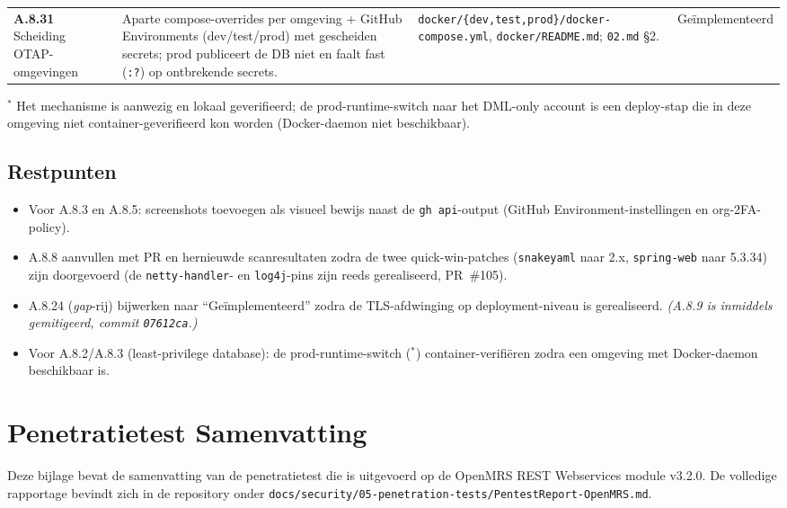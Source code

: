 \documentclass[12pt, a4paper]{report}
\begin{document}
{\begin{longtable}{@{}
    >{\raggedright\arraybackslash}p{2.0cm}
    >{\raggedright\arraybackslash}p{4.3cm}
    >{\raggedright\arraybackslash}p{6.2cm}
    >{\raggedright\arraybackslash}p{2.0cm}@{}}
\textbf{A.8.31} Scheiding OTAP-omgevingen &
Aparte compose-overrides per omgeving + GitHub Environments
(dev/test/prod) met gescheiden secrets; prod publiceert de DB niet en faalt
fast (\texttt{:?}) op ontbrekende secrets. &
\texttt{docker/\allowbreak\{dev,test,prod\}/\allowbreak docker-compose.yml},
\texttt{docker/\allowbreak README.md}; \texttt{02.md} \S2. &
Geïmplementeerd \\

\end{longtable}
}

$^\ast$ Het mechanisme is aanwezig en lokaal geverifieerd; de
prod-runtime-switch naar het DML-only account is een deploy-stap die in deze
omgeving niet container-geverifieerd kon worden (Docker-daemon niet
beschikbaar).

\section*{Restpunten}

\begin{itemize}
    \item Voor A.8.3 en A.8.5: screenshots toevoegen als visueel bewijs
          naast de \texttt{gh api}-output
          (GitHub Environment-instellingen en org-2FA-policy).
    \item A.8.8 aanvullen met PR en hernieuwde scanresultaten zodra de twee
          quick-win-patches (\texttt{snakeyaml} naar 2.x,
          \texttt{spring-web} naar 5.3.34) zijn doorgevoerd (de
          \texttt{netty-handler}- en \texttt{log4j}-pins zijn reeds gerealiseerd,
          PR~\#105).
    \item A.8.24 (\emph{gap}-rij) bijwerken naar ``Geïmplementeerd'' zodra de
          TLS-afdwinging op deployment-niveau is gerealiseerd. \emph{(A.8.9 is
          inmiddels gemitigeerd, commit \texttt{07612ca}.)}
    \item Voor A.8.2/A.8.3 (least-privilege database): de prod-runtime-switch
          ($^\ast$) container-verifiëren zodra een omgeving met
          Docker-daemon beschikbaar is.
\end{itemize}

\chapter{Penetratietest Samenvatting}
\label{app:pentest}

Deze bijlage bevat de samenvatting van de penetratietest die is uitgevoerd op de
OpenMRS REST Webservices module v3.2.0. De volledige rapportage bevindt zich in de
repository onder \texttt{docs/security/05-penetration-tests/PentestReport-OpenMRS.md}.
\end{document}
